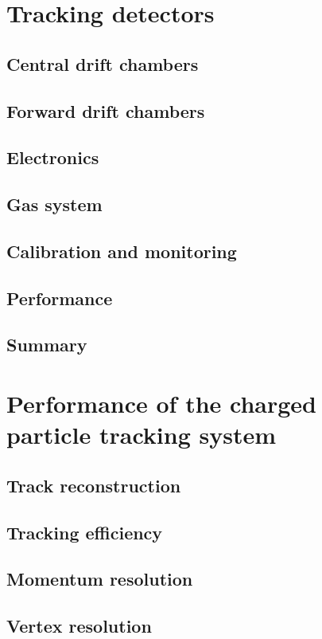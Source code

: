\section{Tracking detectors \label{sec:tracking}}
\subsection{Central drift chambers \label{sec:cdc}}
\subsection{Forward drift chambers \label{sec:fdc}}
\subsection{Electronics \label{sec:dcelectronics}}
\subsection{Gas system \label{sec:gas}}
\subsection{Calibration and monitoring \label{sec:dccalib}}
\subsection{Performance \label{sec:dcperformance}}
\subsection{Summary \label{sec:dcsummary}}
 
\section{Performance of the charged particle tracking system}
\subsection{Track reconstruction}
\subsection{Tracking efficiency}
\subsection{Momentum resolution}
\subsection{Vertex resolution}
